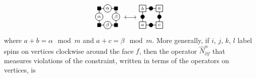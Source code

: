 %
%
\begin{equation}
    \begin{tikzpicture}[baseline={(0,-0.12)}, scale=0.7]
        \draw [semithick] (-4ex, -4ex) rectangle (4ex, 4ex);
        \begin{scope}[every node/.style={circle,draw,black,semithick,fill=white,minimum size=4.5mm}]
            \node [label=center:{\scriptsize $\alpha$},scale=0.85] (A) at (0, 4ex) {};
            \node [label=center:{\scriptsize $\alpha$},scale=0.85] (B) at (-4ex, 0) {};
            \node [label=center:{\scriptsize $\beta$},scale=0.85] (C) at (0, -4ex) {};
            \node [label=center:{\scriptsize $\beta$},scale=0.85] (C) at (4ex, 0) {};
        \end{scope}
        \begin{scope}[every node/.style={rectangle,draw,black,fill=black,minimum size=0mm, inner sep=2.5pt}]
            \node (A) at (-4ex, -4ex) {};
            \node (B) at (-4ex, 4ex) {};
            \node (C) at (4ex, 4ex) {};
            \node (C) at (4ex, -4ex) {};
        \end{scope} 
    \end{tikzpicture}
    \longleftrightarrow
    \begin{tikzpicture}[baseline={(0,-0.12)}, scale=0.7]
        \draw [semithick] (-4ex, -4ex) rectangle (4ex, 4ex);
        \begin{scope}[every node/.style={rectangle,draw,black,semithick,fill=white,minimum size=4mm}]
            \node [label=center:{\scriptsize $a$},scale=0.85] (A) at (-4ex, -4ex) {};
            \node [label=center:{\scriptsize $b$},scale=0.85] (B) at (-4ex, 4ex) {};
            \node [label=center:{\scriptsize $a$},scale=0.85] (C) at (4ex, 4ex) {};
            \node [label=center:{\scriptsize $c$},scale=0.85] (C) at (4ex, -4ex) {};
        \end{scope}
        \begin{scope}[every node/.style={circle,draw,black,fill=black,minimum size=0mm, inner sep=2pt}]
            \node (A) at (0, 4ex) {};
            \node (B) at (-4ex, 0) {};
            \node (C) at (0, -4ex) {};
            \node (C) at (4ex, 0) {};
        \end{scope}
    \end{tikzpicture}
    \label{eqn:vertex-constraint-graphical}
\end{equation}
%
%
where $a + b = \alpha \mod m$ and $a + c = \beta \mod m$.
More generally, if $i$, $j$, $k$, $l$ label spins on vertices clockwise around the face $f$, then the operator $\hat{N}_{\partial f}^{\alpha}$ that measures violations of the constraint, written in terms of the operators on vertices, is
